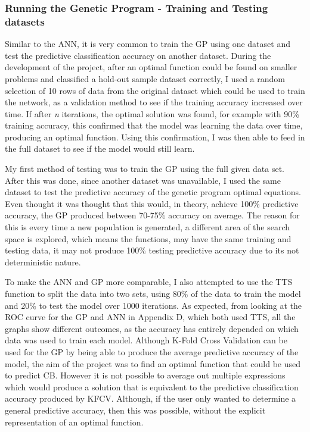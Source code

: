 \documentclass[11pt]{article}
\begin{document}
\subsubsection{Running the Genetic Program - Training and Testing datasets}\label{subsubsec:RGPTT}
Similar to the ANN, it is very common to train the GP using one dataset and test the predictive classification accuracy on another dataset. During the development of the project, after an optimal function could be found on smaller problems and classified a hold-out sample dataset correctly, I used a random selection of 10 rows of data from the original dataset which could be used to train the network, as a validation method to see if the training accuracy increased over time. If after \textit{n} iterations, the optimal solution was found, for example with 90\% training accuracy, this confirmed that the model was learning the data over time, producing an optimal function. Using this confirmation, I was then able to feed in the full dataset to see if the model would still learn.

My first method of testing was to train the GP using the full given data set. After this was done, since another dataset was unavailable, I used the same dataset to test the predictive accuracy of the genetic program optimal equations. Even thought it was thought that this would, in theory, achieve 100\% predictive accuracy, the GP produced between 70-75\% accuracy on average. The reason for this is every time a new population is generated, a different area of the search space is explored, which means the functions, may have the same training and testing data, it may not produce 100\% testing predictive accuracy due to its not deterministic nature. 

To make the ANN and GP more comparable, I also attempted to use the TTS function to split the data into two sets, using 80\% of the data to train the model and 20\% to test the model over 1000 iterations.  As expected, from looking at the ROC curve for the GP and ANN in Appendix D, which both used TTS, all the graphs show different outcomes, as the accuracy has entirely depended on which data was used to train each model. 
Although K-Fold Cross Validation can be used for the GP by being able to produce the average predictive accuracy of the model, the aim of the project was to find an optimal function that could be used to predict CB. However it is not possible to average out multiple expressions which would produce a solution that is equivalent to the predictive classification accuracy produced by KFCV. Although, if the user only wanted to determine a general predictive accuracy, then this was possible, without the explicit representation of an optimal function. 
\end{document}
